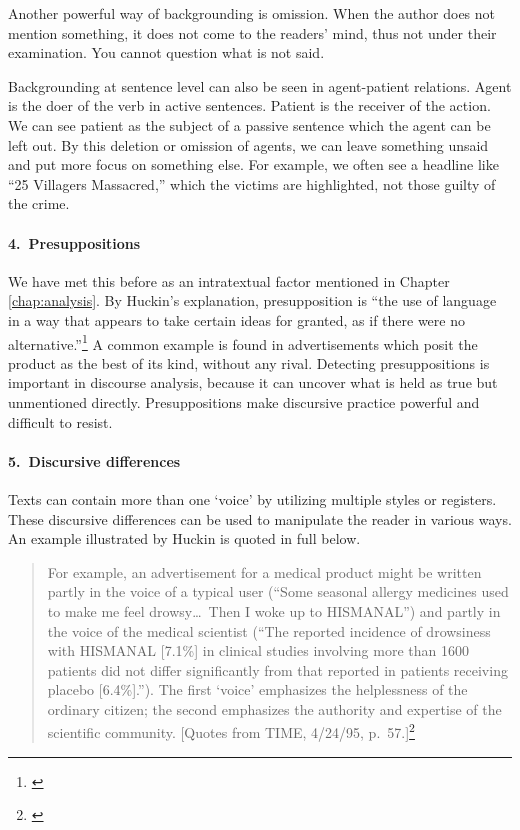 Another powerful way of backgrounding is omission. When the author does not mention something, it does not come to the readers' mind, thus not under their examination. You cannot question what is not said.

Backgrounding at sentence level can also be seen in agent-patient relations. Agent is the doer of the verb in active sentences. Patient is the receiver of the action. We can see patient as the subject of a passive sentence which the agent can be left out. By this deletion or omission of agents, we can leave something unsaid and put more focus on something else. For example, we often see a headline like ``25 Villagers Massacred,'' which the victims are highlighted, not those guilty of the crime. 

\paragraph*{4.\ Presuppositions} We have met this before as an intratextual factor mentioned in Chapter \ref{chap:analysis}. By Huckin's explanation, presupposition is ``the use of language in a way that appears to take certain ideas for granted, as if there were no alternative.''\footnote{\citealp[p.~82]{huckin:cda}} A common example is found in advertisements which posit the product as the best of its kind, without any rival. Detecting presuppositions is important in discourse analysis, because it can uncover what is held as true but unmentioned directly. Presuppositions make discursive practice powerful and difficult to resist.

\paragraph*{5.\ Discursive differences} Texts can contain more than one `voice' by utilizing multiple styles or registers. These discursive differences can be used to manipulate the reader in various ways. An example illustrated by Huckin is quoted in full below.

\begin{quote}
For example, an advertisement for a medical product might be written partly in the voice of a typical user (``Some seasonal allergy medicines used to make me feel drowsy\ldots\ Then I woke up to HISMANAL'') and partly in the voice of the medical scientist (``The reported incidence of drowsiness with HISMANAL [7.1\%] in clinical studies involving more than 1600 patients did not differ significantly from that reported in patients receiving placebo [6.4\%].''). The first `voice' emphasizes the helplessness of the ordinary citizen; the second emphasizes the authority and expertise of the scientific community. [Quotes from TIME, 4/24/95, p.\ 57.]\footnote{\citealp[p.~83]{huckin:cda}}
\end{quote}

